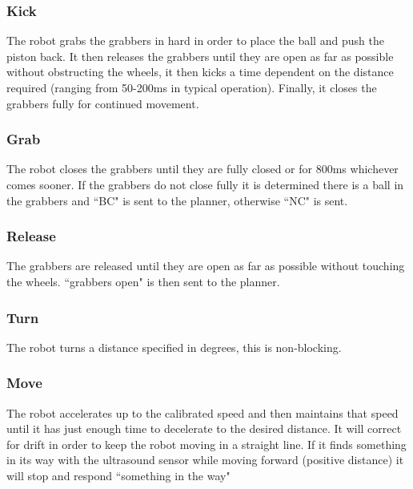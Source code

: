 \subsubsection{Kick}
The robot grabs the grabbers in hard in order to place the ball and push the piston back. It then releases the grabbers until they are open as far as possible without obstructing the wheels, it then kicks a time dependent on the distance required (ranging from 50-200ms in typical operation). Finally, it closes the grabbers fully for continued movement.

\subsubsection{Grab}
The robot closes the grabbers until they are fully closed or for 800ms whichever comes sooner. If the grabbers do not close fully it is determined there is a ball in the grabbers and ``BC" is sent to the planner, otherwise ``NC" is sent.  

\subsubsection{Release}
The grabbers are released until they are open as far as possible without touching the wheels. ``grabbers open" is then sent to the planner. 

\subsubsection{Turn}
The robot turns a distance specified in degrees, this is non-blocking. 

\subsubsection{Move}
The robot accelerates up to the calibrated speed and then maintains that speed until it has just enough time to decelerate to the desired distance. It will correct for drift in order to keep the robot moving in a straight line. If it finds something in its way with the ultrasound sensor while moving forward (positive distance) it will stop and respond ``something in the way"

